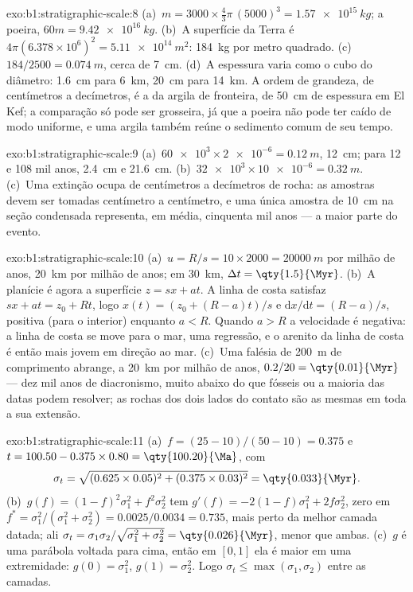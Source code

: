 \begin{solution}{exo:b1:stratigraphic-scale:8}
(a)~$m = 3000 \times \frac43\pi\,(5000)^3 = \qty{1.57e15}{kg}$; a poeira,
$60m = \qty{9.42e16}{kg}$. (b)~A superfície da Terra é $4\pi(6.378\times10^6)^2
= \qty{5.11e14}{m^2}$: \qty{184}{kg} por metro quadrado. (c)~$184/2500 =
\qty{0.074}{m}$, cerca de \qty{7}{cm}. (d)~A espessura varia como o cubo do
diâmetro: \qty{1.6}{cm} para \qty{6}{km}, \qty{20}{cm} para \qty{14}{km}. A ordem
de grandeza, de centímetros a decímetros, é a da argila de fronteira, de \qty{50}{cm} de
espessura em El Kef; a comparação só pode ser grosseira, já que a poeira não pode ter caído de
modo uniforme, e uma argila também reúne o sedimento comum de seu tempo.
\end{solution}

\begin{solution}{exo:b1:stratigraphic-scale:9}
(a)~$\num{60e3} \times \num{2e-6} = \qty{0.12}{m}$, \qty{12}{cm}; para 12 e 108 mil anos,
\qty{2.4}{cm} e \qty{21.6}{cm}. (b)~$\num{32e3} \times
\num{10e-6} = \qty{0.32}{m}$. (c)~Uma extinção ocupa de centímetros a decímetros de rocha: as
amostras devem ser tomadas centímetro a centímetro, e uma única amostra de \qty{10}{cm} na seção
condensada representa, em média, cinquenta mil anos --- a maior parte do evento.
\end{solution}

\begin{solution}{exo:b1:stratigraphic-scale:10}
(a)~$u = R/s = 10 \times 2000 = \qty{20000}{m}$ por milhão de anos,
\qty{20}{km} por milhão de anos; em \qty{30}{km}, $\Delta t = \qty{1.5}{\Myr}$.
(b)~A planície é agora a superfície $z = s x + a t$. A linha de costa satisfaz
$s x + a t = z_0 + R t$, logo $x(t) = (z_0 + (R - a)t)/s$ e
$\mathrm dx/\mathrm dt = (R - a)/s$, positiva (para o interior) enquanto $a < R$. Quando
$a > R$ a velocidade é negativa: a linha de costa se move para o mar, uma regressão, e o
arenito da linha de costa é então mais jovem em direção ao mar. (c)~Uma falésia de
\qty{200}{m} de comprimento abrange, a \qty{20}{km} por milhão de anos, $0.2/20 = \qty{0.01}{\Myr}$
--- dez mil anos de diacronismo, muito abaixo do que fósseis ou a maioria das datas podem
resolver; as rochas dos dois lados do contato são as mesmas em toda a sua extensão.
\end{solution}

\begin{solution}{exo:b1:stratigraphic-scale:11}
(a)~$f = (25 - 10)/(50 - 10) = 0.375$ e $t = 100.50 - 0.375 \times 0.80 =
\qty{100.20}{\Ma}$, com
\[
  \sigma_t = \sqrt{(0.625 \times 0.05)^2 + (0.375 \times 0.03)^2} = \qty{0.033}{\Myr}.
\] (b)~$g(f) = (1 - f)^2\sigma_1^2 + f^2\sigma_2^2$
tem $g'(f) = -2(1 - f)\sigma_1^2 + 2f\sigma_2^2$, zero em $f^* =
\sigma_1^2/(\sigma_1^2 + \sigma_2^2) = 0.0025/0.0034 = 0.735$, mais perto da melhor
camada datada; ali $\sigma_t = \sigma_1\sigma_2/\sqrt{\sigma_1^2 + \sigma_2^2} =
\qty{0.026}{\Myr}$, menor que ambas. (c)~$g$ é uma parábola voltada para cima, então
em $[0, 1]$ ela é maior em uma extremidade: $g(0) = \sigma_1^2$, $g(1) = \sigma_2^2$.
Logo $\sigma_t \le \max(\sigma_1, \sigma_2)$ entre as camadas.
\end{solution}

